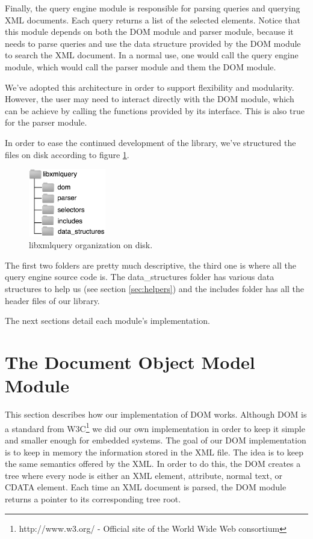 \documentclass[a4paper]{report}
\begin{document}
	Finally, the query engine module is responsible for parsing queries and querying XML documents. Each query returns a list of the selected elements. Notice that this module depends on both the DOM module and parser 
	module, because it needs to parse queries and use the data structure provided by the DOM module to search the XML document. In a normal use, one would call the query engine module, which would call the parser 
	module and them the DOM module.
	
	We've adopted this architecture in order to support flexibility and modularity. However, the user may need to interact directly with the DOM module, which can be achieve by calling the functions provided by its interface.
	This is also true for the parser module. 
	
	In order to ease the continued development of the library, we've structured the files on disk according to figure \ref{fig:disk}.

	 \begin{figure}[h!]
		\centering
		\label{fig:disk}
		\includegraphics[width=0.30\textwidth] {disk}
		\caption{libxmlquery organization on disk.}
	 \end{figure}
	
	The first two folders are pretty much descriptive, the third one is where all the query engine source code is. The data\_structures folder has various data structures to help us (see section \ref{sec:helpers}) and the includes 
	folder has all the header files of our library.
	
	The next sections detail each module's implementation.

\section{The Document Object Model Module}\label{sec:dom}
	This section describes how our implementation of DOM works. Although DOM is a standard from W3C\footnote{http://www.w3.org/ - Official site of the World Wide Web consortium} we did our own implementation in order 
	to keep it simple and smaller enough for embedded systems. The goal of our DOM implementation is to keep in memory the information stored in the XML file. The idea is to keep the same semantics offered by the XML. In
	order to do this, the DOM creates a tree where every node is either an XML element, attribute, normal text, or CDATA element. Each time an XML document is parsed, the DOM module returns a pointer to its corresponding
	tree root.
	
\end{document}
